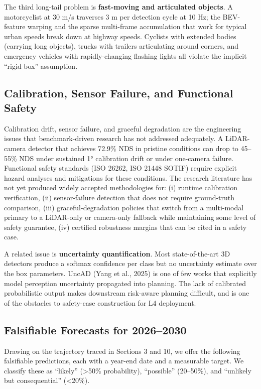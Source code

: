 The third long-tail problem is \textbf{fast-moving and articulated objects}. A motorcyclist at 30 m/s traverses 3 m per detection cycle at 10 Hz; the BEV-feature warping and the sparse multi-frame accumulation that work for typical urban speeds break down at highway speeds. Cyclists with extended bodies (carrying long objects), trucks with trailers articulating around corners, and emergency vehicles with rapidly-changing flashing lights all violate the implicit ``rigid box'' assumption.

\subsection{Calibration, Sensor Failure, and Functional Safety}\label{calibration-sensor-failure-and-functional-safety}

Calibration drift, sensor failure, and graceful degradation are the engineering issues that benchmark-driven research has not addressed adequately. A LiDAR-camera detector that achieves 72.9\% NDS in pristine conditions can drop to 45--55\% NDS under sustained 1° calibration drift or under one-camera failure. Functional safety standards (ISO 26262, ISO 21448 SOTIF) require explicit hazard analyses and mitigations for these conditions. The research literature has not yet produced widely accepted methodologies for: (i) runtime calibration verification, (ii) sensor-failure detection that does not require ground-truth comparison, (iii) graceful-degradation policies that switch from a multi-modal primary to a LiDAR-only or camera-only fallback while maintaining some level of safety guarantee, (iv) certified robustness margins that can be cited in a safety case.

A related issue is \textbf{uncertainty quantification}. Most state-of-the-art 3D detectors produce a softmax confidence per class but no uncertainty estimate over the box parameters. UncAD (Yang et al., 2025) is one of few works that explicitly model perception uncertainty propagated into planning. The lack of calibrated probabilistic output makes downstream risk-aware planning difficult, and is one of the obstacles to safety-case construction for L4 deployment.

\subsection{Falsifiable Forecasts for 2026--2030}\label{falsifiable-forecasts-for-20262030}

Drawing on the trajectory traced in Sections 3 and 10, we offer the following falsifiable predictions, each with a year-end date and a measurable target. We classify these as ``likely'' (\textgreater50\% probability), ``possible'' (20--50\%), and ``unlikely but consequential'' (\textless20\%).

